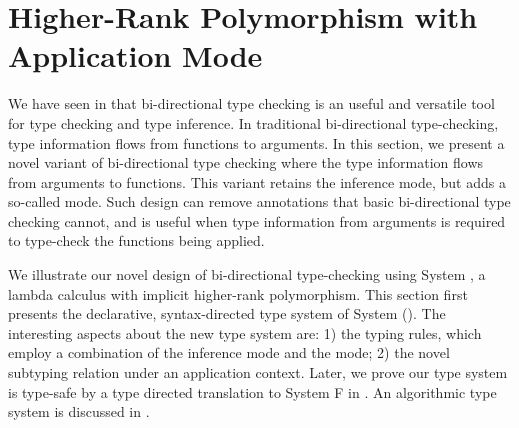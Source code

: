 \chapter{Higher-Rank Polymorphism with Application Mode}
\label{chap:BiDirectional}

We have seen in  that bi-directional type checking is an
useful and versatile tool for type checking and type inference. In traditional
bi-directional type-checking, type information flows from functions to
arguments. In this section, we present a novel variant of bi-directional type
checking where the type information flows from arguments to functions. This
variant retains the inference mode, but adds a so-called \textit{\mode} mode.
Such design can remove annotations that basic bi-directional type checking
cannot, and is useful when type information from arguments is required to
type-check the functions being applied.

We illustrate our novel design of bi-directional type-checking using System \ap,
a lambda calculus with implicit higher-rank polymorphism. This section first
presents the declarative, syntax-directed type system of System \ap
(). The interesting aspects about the new type system
are: 1) the typing rules, which employ a combination of the inference mode and
the \textit{\mode} mode; 2) the novel subtyping relation under an application
context. Later, we prove our type system is type-safe by a type directed
translation to System F in . An algorithmic type system
is discussed in .












